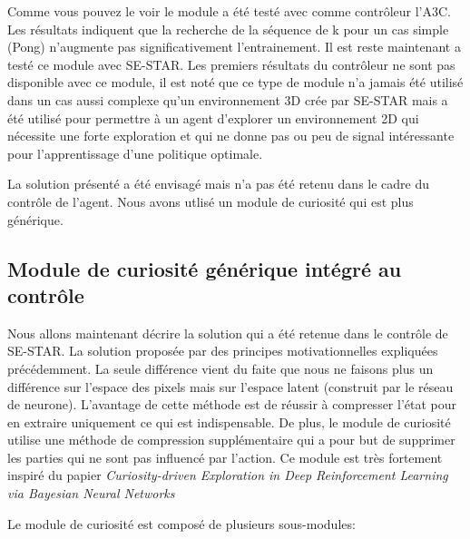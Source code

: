 Comme vous pouvez le voir le module a été testé avec comme contrôleur l'A3C. Les résultats indiquent que la recherche de la séquence de k pour un cas simple (Pong) n'augmente pas significativement l'entrainement. Il est reste maintenant a testé ce module avec SE-STAR. Les premiers résultats du contrôleur ne sont pas disponible avec ce module, il est noté que ce type de module n'a jamais été utilisé dans un cas aussi complexe qu'un environnement 3D crée par SE-STAR mais a été utilisé pour permettre à un agent d'explorer un environnement 2D qui nécessite une forte exploration et qui ne donne pas ou peu de signal intéressante pour l'apprentissage d'une politique optimale.

La solution présenté a été envisagé mais n'a pas été retenu dans le cadre du contrôle de l'agent. Nous avons utlisé un module de curiosité qui est plus générique.

\subsection{Module de curiosité générique intégré au contrôle}

Nous allons maintenant décrire la solution qui a été retenue dans le contrôle de SE-STAR. La solution proposée par des principes motivationnelles expliquées précédemment. La seule différence vient du faite que nous ne faisons plus un différence sur l'espace des pixels mais sur l'espace latent (construit par le réseau de neurone). L'avantage de cette méthode est de réussir à compresser l'état pour en extraire uniquement ce qui est indispensable. De plus, le module de curiosité utilise une méthode de compression supplémentaire qui a pour but de supprimer les parties qui ne sont pas influencé par l'action. Ce module est très fortement inspiré du papier \emph{Curiosity-driven Exploration in Deep Reinforcement Learning via Bayesian Neural Networks}\cite{curiositydriven}


Le module de curiosité est composé de plusieurs sous-modules:

